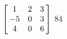 {$\left[\hskip -3pt \begin{array}{ccc} 1&2&3\\  -5&0&3
\\  4&0&6\end{array}\hskip -3pt \right]$} 
{$84$}



  

